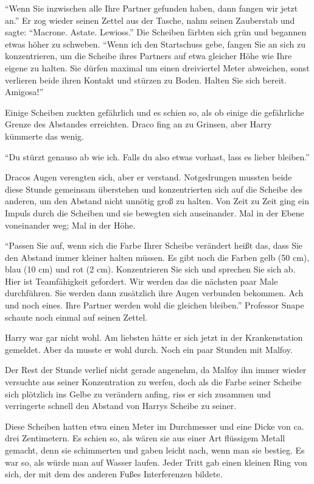 \enquote{Wenn Sie inzwischen alle Ihre Partner gefunden haben, dann fangen wir jetzt an.} Er zog wieder seinen Zettel aus der Tasche, nahm seinen Zauberstab und sagte: \enquote{Macrone. Astate. Lewioss.} Die Scheiben färbten sich grün und begannen etwas höher zu schweben. \enquote{Wenn ich den Startschuss gebe, fangen Sie an sich zu konzentrieren, um die Scheibe ihres Partners auf etwa gleicher Höhe wie Ihre eigene zu halten. Sie dürfen maximal um einen dreiviertel Meter abweichen, sonst verlieren beide ihren Kontakt und stürzen zu Boden. Halten Sie sich bereit. \gst Amigosa!}

Einige Scheiben zuckten gefährlich und es schien so, als ob einige die gefährliche Grenze des Abstandes erreichten. Draco fing an zu Grinsen, aber Harry kümmerte das wenig.

\enquote{Du stürzt genauso ab wie ich. Falls du also etwas vorhast, lass es lieber bleiben.}

Dracos Augen verengten sich, aber er verstand. Notgedrungen mussten beide diese Stunde gemeinsam überstehen und konzentrierten sich auf die Scheibe des anderen, um den Abstand nicht unnötig groß zu halten. Von Zeit zu Zeit ging ein Impuls durch die Scheiben und sie bewegten sich auseinander. Mal in der Ebene voneinander weg; Mal in der Höhe.

\enquote{Passen Sie auf, wenn sich die Farbe Ihrer Scheibe verändert heißt das, dass Sie den Abstand immer kleiner halten müssen. Es gibt noch die Farben gelb (50 cm), blau (10 cm) und rot (2 cm). Konzentrieren Sie sich und sprechen Sie sich ab. Hier ist Teamfähigkeit gefordert. Wir werden das die nächsten paar Male durchführen. Sie werden dann zusätzlich ihre Augen verbunden bekommen. Ach und noch eines. Ihre Partner werden wohl die gleichen bleiben.} Professor Snape schaute noch einmal auf seinen Zettel.

Harry war gar nicht wohl. Am liebsten hätte er sich jetzt in der Krankenstation gemeldet. Aber da musste er wohl durch. Noch ein paar Stunden mit Malfoy.

Der Rest der Stunde verlief nicht gerade angenehm, da Malfoy ihn immer wieder versuchte aus seiner Konzentration zu werfen, doch als die Farbe seiner Scheibe sich plötzlich ins Gelbe zu verändern anfing, riss er sich zusammen und verringerte schnell den Abstand von Harrys Scheibe zu seiner.

Diese Scheiben hatten etwa einen Meter im Durchmesser und eine Dicke von ca. drei Zentimetern. Es schien so, als wären sie aus einer Art flüssigem Metall gemacht, denn sie schimmerten und gaben leicht nach, wenn man sie bestieg. Es war so, als würde man auf Wasser laufen. Jeder Tritt gab einen kleinen Ring von sich, der mit dem des anderen Fußes Interferenzen bildete.

